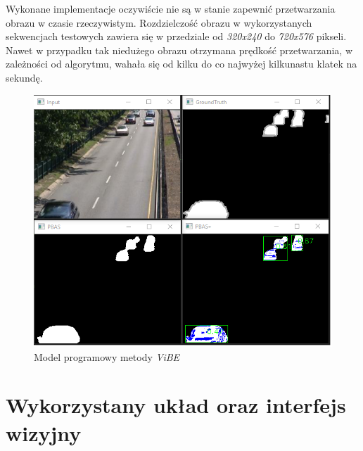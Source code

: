 Wykonane implementacje oczywiście nie są w stanie zapewnić przetwarzania obrazu w czasie rzeczywistym. Rozdzielczość obrazu w wykorzystanych sekwencjach testowych zawiera się w przedziale od \textit{320x240} do \textit{720x576} pikseli. Nawet w przypadku tak niedużego obrazu otrzymana prędkość przetwarzania, w zależności od algorytmu, wahała się od kilku do co najwyżej kilkunastu klatek na sekundę. 

    \begin{figure}[h!]
        \centering
        \includegraphics[scale=0.55]{img/4/vibe_module_cpp.png}
        \caption{Model programowy metody \textit{ViBE}}
	    \label{fig:vibe_cpp}
    \end{figure}


\section{Wykorzystany układ oraz interfejs wizyjny}
\label{sec:uklad_interfejs}

